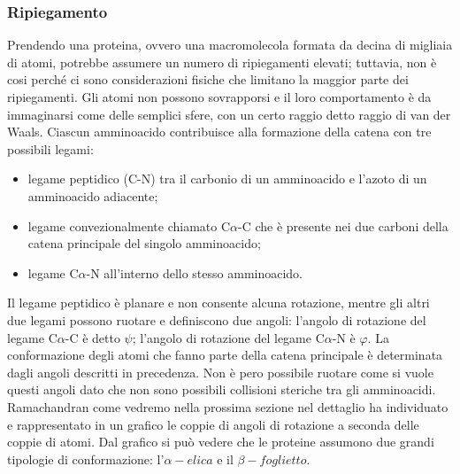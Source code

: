 \subsubsection{Ripiegamento}\label{subsec:es_subsec}
Prendendo una proteina, ovvero una macromolecola formata da decina di migliaia di atomi, potrebbe assumere un numero di ripiegamenti elevati; tuttavia, non è 
cosi perché ci sono considerazioni fisiche che limitano la maggior parte dei ripiegamenti. Gli atomi non possono sovrapporsi e il loro comportamento è da immaginarsi
come delle semplici sfere, con un certo raggio detto raggio di van der Waals. Ciascun amminoacido contribuisce alla formazione della catena con tre possibili legami:
\vspace{10pt}
\begin{itemize}
    \item legame peptidico (C-N) tra il carbonio di un amminoacido e l'azoto di un amminoacido adiacente;
    \vspace{5pt}
    \item legame convezionalmente chiamato C$\alpha$-C che è presente nei due carboni della catena principale del singolo amminoacido;
    \vspace{5pt}
    \item legame C$\alpha$-N all'interno dello stesso amminoacido.
\end{itemize} 

Il legame peptidico è planare e non consente alcuna rotazione, mentre gli altri due legami possono ruotare e definiscono due angoli: l'angolo di rotazione del 
legame C$\alpha$-C è detto $\psi$; l'angolo di rotazione del legame C$\alpha$-N è $\varphi$. La conformazione degli atomi che fanno parte della catena principale 
è determinata dagli angoli descritti in precedenza. Non è pero possibile ruotare come si vuole questi angoli dato che non sono possibili collisioni steriche tra gli 
amminoacidi. Ramachandran come vedremo nella prossima sezione nel dettaglio ha individuato e rappresentato in un grafico le coppie di angoli di rotazione a seconda
delle coppie di atomi. Dal grafico si può vedere che le proteine assumono due grandi tipologie di conformazione: l'$\alpha-elica$ e il $\beta-foglietto$.

